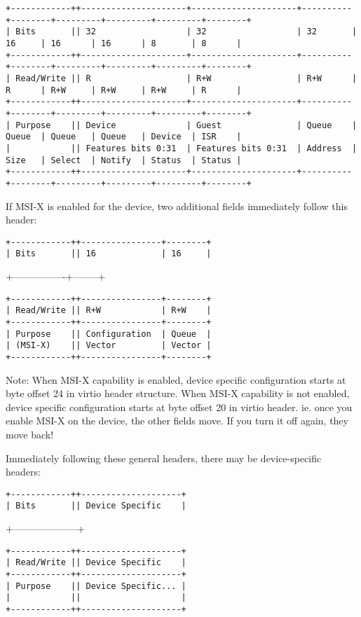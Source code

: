 \begin{verbatim}
+------------++---------------------+---------------------+----------+--------+---------+---------+---------+--------+
| Bits       || 32                  | 32                  | 32       | 16     | 16      | 16      | 8       | 8      |
+------------++---------------------+---------------------+----------+--------+---------+---------+---------+--------+
| Read/Write || R                   | R+W                 | R+W      | R      | R+W     | R+W     | R+W     | R      |
+------------++---------------------+---------------------+----------+--------+---------+---------+---------+--------+
| Purpose    || Device              | Guest               | Queue    | Queue  | Queue   | Queue   | Device  | ISR    |
|            || Features bits 0:31  | Features bits 0:31  | Address  | Size   | Select  | Notify  | Status  | Status |
+------------++---------------------+---------------------+----------+--------+---------+---------+---------+--------+
\end{verbatim}


If MSI-X is enabled for the device, two additional fields
immediately follow this header:


\begin{verbatim}
+------------++----------------+--------+
| Bits       || 16             | 16     |
\end{verbatim}
              +----------------+--------+
\begin{verbatim}
+------------++----------------+--------+
| Read/Write || R+W            | R+W    |
+------------++----------------+--------+
| Purpose    || Configuration  | Queue  |
| (MSI-X)    || Vector         | Vector |
+------------++----------------+--------+
\end{verbatim}

Note: When MSI-X capability is enabled, device specific configuration starts at
byte offset 24 in virtio header structure. When MSI-X capability is not
enabled, device specific configuration starts at byte offset 20 in virtio
header.  ie. once you enable MSI-X on the device, the other fields move.
If you turn it off again, they move back!

Immediately following these general headers, there may be
device-specific headers:

\begin{verbatim}
+------------++--------------------+
| Bits       || Device Specific    |
\end{verbatim}
              +--------------------+
\begin{verbatim}
+------------++--------------------+
| Read/Write || Device Specific    |
+------------++--------------------+
| Purpose    || Device Specific... |
|            ||                    |
+------------++--------------------+
\end{verbatim}

